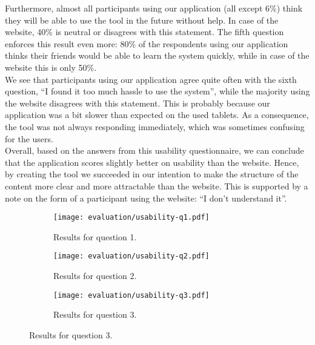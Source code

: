 Furthermore, almost all participants using our application (all except 6\%) think they will be able to use the tool in the future without help. In case of the website, 40\% is neutral or disagrees with this statement. The fifth question enforces this result even more: 80\% of the respondents using our application thinks their friends would be able to learn the system quickly, while in case of the website this is only 50\%.\\

We see that participants using our application agree quite often with the sixth question, ``I found it too much hassle to use the system'', while the majority using the website disagrees with this statement. This is probably because our application was a bit slower than expected on the used tablets. As a consequence, the tool was not always responding immediately, which was sometimes confusing for the users.\\

Overall, based on the answers from this usability questionnaire, we can conclude that the application scores slightly better on usability than the website. Hence, by creating the tool we succeeded in our intention to make the structure of the content more clear and more attractable than the website. This is supported by a note on the form of a participant using the website: ``I don't understand it''.


\begin{figure}[h]
	\centering
	\begin{subfigure}{.8\textwidth}
  		\centering
  		\texttt{[image: evaluation/usability-q1.pdf]}
  		\caption{Results for question 1.}
	\end{subfigure}\par\bigskip
	
	\begin{subfigure}{.8\textwidth}
  		\centering
  		\texttt{[image: evaluation/usability-q2.pdf]}
  		\caption{Results for question 2.}
	\end{subfigure}\par\bigskip
	
	\begin{subfigure}{.8\textwidth}
  		\centering
  		\texttt{[image: evaluation/usability-q3.pdf]}
  		\caption{Results for question 3.}
	\end{subfigure}
\end{figure}

